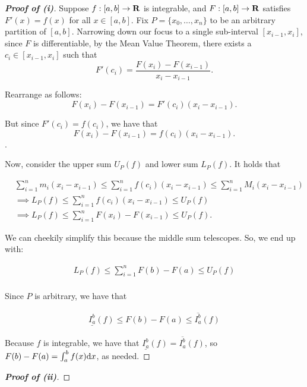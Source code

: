 \documentclass{article}
\begin{document}
  \begin{proof}[\textbf{Proof of (i)}]
    Suppose \(f:[a,b] \to \mathbf{R}\) is integrable, and \(F:[a,b] \to \mathbf{R}\) satisfies \(F'(x) = f(x)\) for all \(x \in [a,b].\) Fix \(P = \{x_0,\ldots, x_n\}\) to be an arbitrary partition of \([a,b]\). Narrowing down our focus to a single sub-interval \([x_{i-1},x_i]\), since \(F\) is differentiable, by the Mean Value Theorem, there exists a \(c_i \in [x_{i-1},x_i]\) such that
    \[
      F'(c_i) = \frac{F(x_i) - F(x_{i-1})}{x_i - x_{i-1}}.
    \] 

    Rearrange as follows:
    \[
      F(x_i) - F(x_{i-1}) = F'(c_i)(x_i - x_{i-1}).
    \]

    But since \(F'(c_i) = f(c_i)\), we have that
    \[
      F(x_i) - F(x_{i-1}) = f(c_i)(x_i - x_{i-1}). 
    \].

    Now, consider the upper sum \(U_P(f)\) and lower sum \(L_P(f)\). It holds that 

    \begin{align*}
      &\sum_{i = 1}^{n}m_i(x_i - x_{i-1}) \leq \sum_{i = 1}^{n}f(c_i)(x_i - x_{i-1}) \leq \sum_{i = 1}^{n}M_i(x_i - x_{i-1}) \\
      &\implies L_P(f) \leq \sum_{i = 1}^{n}f(c_i)(x_i - x_{i-1}) \leq U_P(f) \\
      &\implies L_P(f) \leq \sum_{i = 1}^{n}F(x_i)-F(x_{i-1}) \leq U_P(f).
    \end{align*}

    We can cheekily simplify this because the middle sum telescopes. So, we end up with:

    \begin{align*}
      L_P(f) \leq \sum_{i = 1}^{n}F(b)-F(a) \leq U_P(f) \\
    \end{align*}

    Since \(P\) is arbitrary, we have that

    \begin{align*}
      \underline{I_{a}^{b}}(f) \leq F(b) - F(a) \leq \overline{I_{a}^{b}}(f)
    \end{align*}

    Because \(f\) is integrable, we have that \(\underline{I_{a}^{b}}(f) = \overline{I_{a}^{b}}(f)\), so \(F(b) - F(a) = \int_{a}^{b}f(x) \mathrm{d} x\), as needed.
  \end{proof}

  \begin{proof}[\textbf{Proof of (ii)}]
    
  \end{proof}
\end{document}
